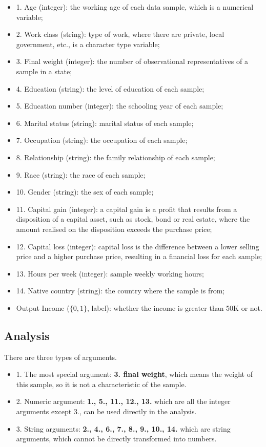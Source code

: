 \documentclass[lettersize,journal]{IEEEtran}
\begin{document}
\begin{itemize}
    \item{1.} Age (integer): the working age of each data sample, which is a numerical variable;
    \item{2.} Work class (string): type of work, where there are private, local government, etc., is a character type variable;
    \item{3.} Final weight (integer): the number of observational representatives of a sample in a state;
    \item{4.} Education (string): the level of education of each sample;
    \item{5.} Education number (integer): the schooling year of each sample;
    \item{6.} Marital status (string): marital status of each sample;
    \item{7.} Occupation (string): the occupation of each sample;
    \item{8.} Relationship (string): the family relationship of each sample;
    \item{9.} Race (string): the race of each sample;
    \item{10.} Gender (string): the sex of each sample;
    \item{11.} Capital gain (integer): a capital gain is a profit that results from a disposition of a capital asset, such as stock, bond or real estate, where the amount realised on the disposition exceeds the purchase price;
    \item{12.} Capital loss (integer): capital loss is the difference between a lower selling price and a higher purchase price, resulting in a financial loss for each sample;
    \item{13.} Hours per week (integer): sample weekly working hours;
    \item{14.} Native country (string): the country where the sample is from;
    \item{Output} Income ($\{0,1\}$, label): whether the income is greater than 50K or not.
\end{itemize}

\subsection{Analysis}

There are three types of arguments.

\begin{itemize}
    \item{1.} The most special argument: \textbf{3. final weight}, which means the weight of this sample, so it is not a characteristic of the sample.
    \item{2.} Numeric argument: \textbf{1., 5., 11., 12., 13.} which are all the integer arguments except 3., can be used directly in the analysis.
    \item{3.} String arguments: \textbf{2., 4., 6., 7., 8., 9., 10., 14.} which are string arguments, which cannot be directly transformed into numbers.
\end{itemize}
\end{document}
